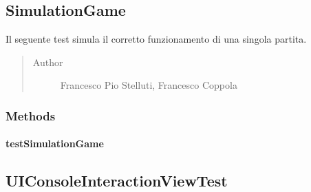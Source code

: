 \documentclass[letterpaper,10pt,italian,openany,oneside]{sphinxmanual}
\begin{document}
\subsection{SimulationGame}
\label{\detokenize{test/it/unicam/cs/pa/mastermind/test/SimulationGame:simulationgame}}\label{\detokenize{test/it/unicam/cs/pa/mastermind/test/SimulationGame::doc}}

\begin{fulllineitems}
\label{\detokenize{test/it/unicam/cs/pa/mastermind/test/SimulationGame:it.unicam.cs.pa.mastermind.test.SimulationGame}}
Il seguente test simula il corretto funzionamento di una singola partita.
\begin{quote}\begin{description}
\item[{Author}] \leavevmode
Francesco Pio Stelluti, Francesco Coppola

\end{description}\end{quote}

\end{fulllineitems}



\subsubsection{Methods}
\label{\detokenize{test/it/unicam/cs/pa/mastermind/test/SimulationGame:methods}}

\paragraph{testSimulationGame}
\label{\detokenize{test/it/unicam/cs/pa/mastermind/test/SimulationGame:testsimulationgame}}

\begin{fulllineitems}
\label{\detokenize{test/it/unicam/cs/pa/mastermind/test/SimulationGame:it.unicam.cs.pa.mastermind.test.SimulationGame.testSimulationGame()}}
\end{fulllineitems}



\subsection{UIConsoleInteractionViewTest}
\label{\detokenize{test/it/unicam/cs/pa/mastermind/test/UIConsoleInteractionViewTest:uiconsoleinteractionviewtest}}\label{\detokenize{test/it/unicam/cs/pa/mastermind/test/UIConsoleInteractionViewTest::doc}}
\end{document}
